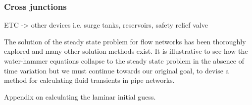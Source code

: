 \subsubsection{Cross junctions}

{\color{red} ETC -> other devices i.e. surge tanks, reservoirs, safety relief valve}

The solution of the steady state problem for flow networks has been thoroughly explored and many other solution methods exist. It is illustrative to see how the water-hammer equations collapse to the steady state problem in the absence of time variation but we must continue towards our original goal, to devise a method for calculating fluid transients in pipe networks. 

{\color{red} Appendix on calculating the laminar initial guess.}
